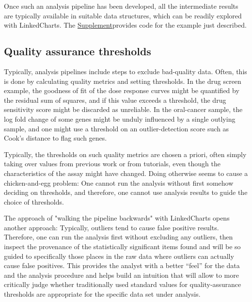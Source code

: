 \documentclass[twocolumn,10pt]{article}
\newcommand{\Supplement}{\href{https://anders-biostat.github.io/lc-paper/}{Supplement}}
\begin{document}
Once such an analysis pipeline has been developed, all the intermediate results are typically available in suitable data structures, which can be readily explored with LinkedCharts. The \Supplement provides code for the example just described.

\subsection{Quality assurance thresholds}

Typically, analysis pipelines include steps to exclude bad-quality data. Often, this is done by calculating quality metrics and setting thresholds. In the drug screen example, the goodness of fit of the dose response curves might be quantified by the residual sum of squares, and if this value exceeds a threshold, the drug sensitivity score might be discarded as unreliable. In the oral-cancer sample, the log fold change of some genes might be unduly influenced by a single outlying sample, and one might use a threshold on an outlier-detection score such as Cook's distance to flag such genes.

Typically, the thresholds on such quality metrics are chosen a priori, often simply taking over values from previous work or from tutorials, even though the characteristics of the assay might have changed. Doing otherwise seems to cause a chicken-and-egg problem: One cannot run the analysis without first somehow deciding on thresholds, and therefore, one cannot use analysis results to guide the choice of thresholds.

The approach of "walking the pipeline backwards" with LinkedCharts opens another approach: Typically, outliers tend to cause false positive results. Therefore, one can run the analysis first without excluding any outliers, then inspect the provenance of the statistically significant items found and will be so guided to specifically those places in the raw data where outliers can actually cause false positives. This provides the analyst with a better ``feel'' for the data and the analysis procedure and helps build an intuition that will allow to more critically judge whether traditionally used standard values for quality-assurance thresholds are appropriate for the specific data set under analysis. 
\end{document}

